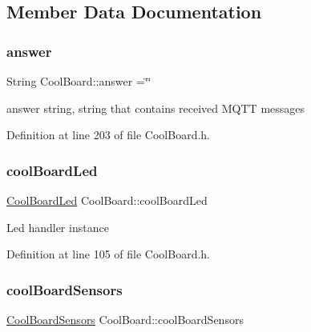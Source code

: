 \subsection{Member Data Documentation}
\mbox{\label{class_cool_board_a7b835fafd449e5282f7f91d787a2dc15}} 
\subsubsection{\texorpdfstring{answer}{answer}}
{\footnotesize\ttfamily String Cool\+Board\+::answer =\char`\"{}\char`\"{}\hspace{0.3cm}{\ttfamily [private]}}

answer string, string that contains received M\+Q\+TT messages 

Definition at line 203 of file Cool\+Board.\+h.

\mbox{\label{class_cool_board_a1b1d3c684a5baa56b08486e192fd8e97}} 
\subsubsection{\texorpdfstring{cool\+Board\+Led}{coolBoardLed}}
{\footnotesize\ttfamily \hyperlink{class_cool_board_led}{Cool\+Board\+Led} Cool\+Board\+::cool\+Board\+Led\hspace{0.3cm}{\ttfamily [private]}}

Led handler instance 

Definition at line 105 of file Cool\+Board.\+h.

\mbox{\label{class_cool_board_af102be5288bd7f7a8e59b13f86e26a00}} 
\subsubsection{\texorpdfstring{cool\+Board\+Sensors}{coolBoardSensors}}
{\footnotesize\ttfamily \hyperlink{class_cool_board_sensors}{Cool\+Board\+Sensors} Cool\+Board\+::cool\+Board\+Sensors\hspace{0.3cm}{\ttfamily [private]}}

